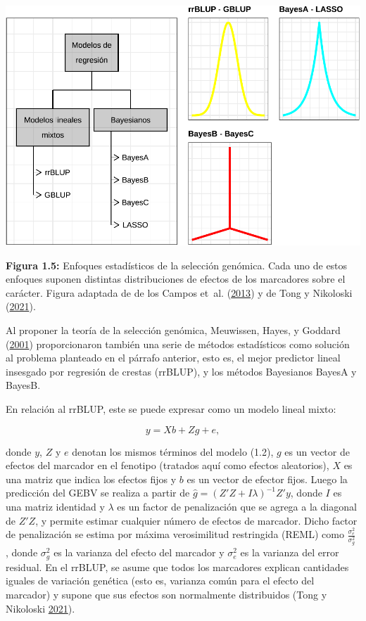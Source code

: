 \documentclass[11pt,spanish,a4paper,oneside,]{book} %
\begin{document}
\begin{center}\includegraphics[width=1\linewidth]{figures/Mod_GS} \end{center}

\begin{center}
\textbf{Figura 1.5:} Enfoques estadísticos de la selección genómica. Cada uno de estos enfoques suponen distintas distribuciones de efectos de los marcadores sobre el carácter. Figura adaptada de de los Campos et~al. (\protect\hyperlink{ref-cite:31}{2013}) y de Tong y Nikoloski (\protect\hyperlink{ref-cite:7}{2021}).

\end{center}

Al proponer la teoría de la selección genómica, Meuwissen, Hayes, y Goddard (\protect\hyperlink{ref-cite:8}{2001}) proporcionaron también una serie de métodos estadísticos como solución al problema planteado en el párrafo anterior, esto es, el mejor predictor lineal insesgado por regresión de crestas (rrBLUP), y los métodos Bayesianos BayesA y BayesB.

En relación al rrBLUP, este se puede expresar como un modelo lineal mixto:

\begin{equation}
y = Xb + Zg + e,
\end{equation}

donde \(y\), \(Z\) y \(e\) denotan los mismos términos del modelo (1.2), \(g\) es un vector de efectos del marcador en el fenotipo (tratados aquí como efectos aleatorios), \(X\) es una matriz que indica los efectos fijos y \(b\) es un vector de efector fijos. Luego la predicción del GEBV se realiza a partir de \(\hat{g} = (Z'Z + I \lambda)^{- 1} Z'y\), donde \(I\) es una matriz identidad y \(\lambda\) es un factor de penalización que se agrega a la diagonal de \(Z'Z\), y permite estimar cualquier número de efectos de marcador. Dicho factor de penalización se estima por máxima verosimilitud restringida (REML) como \(\frac{\sigma^{2}_{e}} {\sigma^{2}_{g}}\) , donde \(\sigma^{2}_{g}\) es la varianza del efecto del marcador y \(\sigma^{2}_{e}\) es la varianza del error residual. En el rrBLUP, se asume que todos los marcadores explican cantidades iguales de variación genética (esto es, varianza común para el efecto del marcador) y supone que sus efectos son normalmente distribuidos (Tong y Nikoloski \protect\hyperlink{ref-cite:7}{2021}).
\end{document}
